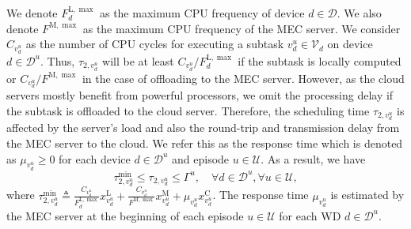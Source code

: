 \documentclass[12pt,draftclsnofoot,onecolumn]{IEEEtran}
\begin{document}
We denote $F^{\text{L},\max}_{d}$ as the maximum CPU frequency of device $d\in\mathcal{D}$. We also denote $F^{\text{M},\max}$ as the maximum CPU frequency of the MEC server. We consider $C_{v_d^u}$ as the number of CPU cycles for executing a subtask $v_d^u\in\mathcal{V}_d$ on device $d\in\mathcal{D}^u$. Thus, $\tau_{2,v_d^u}$ will be at least $C_{v_d^u}/F^{\text{L},\max}_{d}$ if the subtask is locally computed or $C_{v_d^u}/F^{\text{M},\max}$ in the case of offloading to the MEC server. However, as the cloud servers mostly benefit from powerful processors, we omit the processing delay if the subtask is offloaded to the cloud server. Therefore, the scheduling time $\tau_{2,v_d^u}$ is affected by the server's load and also the round-trip and transmission delay from the MEC server to the cloud. We refer this as the response time which is denoted as $\mu_{v_d^u}\geq 0$ for each device $d\in\mathcal{D}^u$ and episode $u\in\mathcal{U}$. As a result, we have
\begin{equation}\label{eq13}
	\tau^{\min}_{2,v_d^u} \leq \tau_{2,v_d^u} \leq\Gamma^u,\quad\forall d\in\mathcal{D}^u, \forall u\in\mathcal{U},
\end{equation}
where $\tau^{\min}_{2,v_d^u}\triangleq\frac{C_{v_d^u}}{F^{\text{L},\max}_{d}}x^{\text{L}}_{v_d^u} + \frac{C_{v_d^u}}{F^{\text{M},\max}}x^{\text{M}}_{v_d^u} +
\mu_{v_d^u}x^{\text{C}}_{v_d^u}$. The response time $\mu_{v_d^u}$ is estimated by the MEC server at the beginning of each episode $u\in\mathcal{U}$ for each WD $d\in\mathcal{D}^u$.
\end{document}
